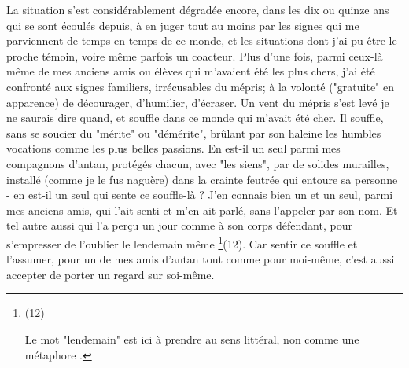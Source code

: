 La situation s'est considérablement dégradée encore, dans les dix ou quinze ans qui se sont écoulés depuis, à en juger tout au moins par les signes qui me parviennent de temps en temps de ce monde, et les situations dont j'ai pu être le proche témoin, voire même parfois un coacteur. Plus d'une fois, parmi ceux-là même de mes anciens amis ou élèves qui m'avaient été les plus chers, j'ai été confronté aux signes familiers, irrécusables du mépris; à la volonté ("gratuite" en apparence) de décourager, d'humilier, d'écraser. Un vent du mépris s'est levé je ne saurais dire quand, et souffle dans ce monde qui m'avait été cher. Il souffle, sans se soucier du "mérite" ou "démérite", brûlant par son haleine les humbles vocations comme les plus belles passions. En est-il un seul parmi mes compagnons d'antan, protégés chacun, avec "les siens", par de solides murailles, installé (comme je le fus naguère) dans la crainte feutrée qui entoure sa personne - en est-il un seul qui sente ce souffle-là ? J'en connais bien un et un seul, parmi mes anciens amis, qui l'ait senti et m'en ait parlé, sans l'appeler par son nom. Et tel autre aussi qui l'a perçu un jour comme à son corps défendant, pour s'empresser de l'oublier le lendemain même \footnote{(12)\par Le mot "lendemain" est ici à prendre au sens littéral, non comme une métaphore .}(12). Car sentir ce souffle et l'assumer, pour un de mes amis d'antan tout comme pour moi-même, c'est aussi accepter de porter un regard sur soi-même.







